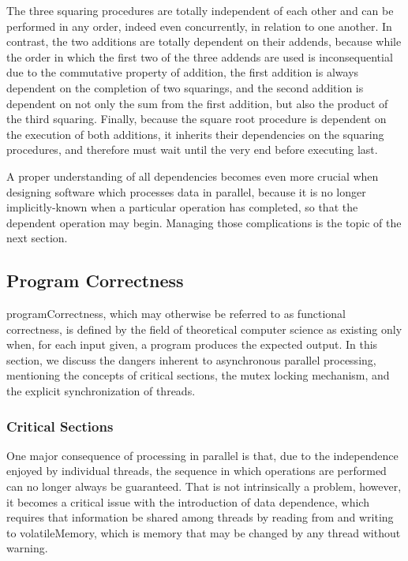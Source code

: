 The three squaring procedures are totally independent of each other and can be performed in any order, indeed even concurrently, in relation to one another. In contrast, the two additions are totally dependent on their addends, because while the order in which the first two of the three addends are used is inconsequential due to the commutative property of addition, the first addition is always dependent on the completion of two squarings, and the second addition is dependent on not only the sum from the first addition, but also the product of the third squaring. Finally, because the square root procedure is dependent on the execution of both additions, it inherits their dependencies on the squaring procedures, and therefore must wait until the very end before executing last.

A proper understanding of all dependencies becomes even more crucial when designing software which processes data in parallel, because it is no longer implicitly-known when a particular operation has completed, so that the dependent operation may begin. Managing those complications is the topic of the next section.

%
%
%
%
\subsection{Program Correctness}
\label{ch2sPPssPC}
\Gls{programCorrectness}, which may otherwise be referred to as functional correctness, is defined by the field of theoretical computer science as existing only when, for each input given, a program produces the expected output. In this section, we discuss the dangers inherent to asynchronous parallel processing, mentioning the concepts of critical sections, the mutex locking mechanism, and the explicit synchronization of threads.

%
%
\subsubsection{Critical Sections}
\label{ch2sPPssPCsssCS}
One major consequence of processing in parallel is that, due to the independence enjoyed by individual threads, the sequence in which operations are performed can no longer always be guaranteed. That is not intrinsically a problem, however, it becomes a critical issue with the introduction of data dependence, which requires that information be shared among threads by reading from and writing to \gls{volatileMemory}, which is memory that may be changed by any thread without warning.

